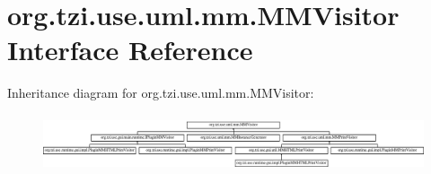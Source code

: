 \hypertarget{interfaceorg_1_1tzi_1_1use_1_1uml_1_1mm_1_1_m_m_visitor}{\section{org.\-tzi.\-use.\-uml.\-mm.\-M\-M\-Visitor Interface Reference}
\label{interfaceorg_1_1tzi_1_1use_1_1uml_1_1mm_1_1_m_m_visitor}
}
Inheritance diagram for org.\-tzi.\-use.\-uml.\-mm.\-M\-M\-Visitor\-:\begin{figure}[H]
\begin{center}
\leavevmode
\includegraphics[height=1.707317cm]{interfaceorg_1_1tzi_1_1use_1_1uml_1_1mm_1_1_m_m_visitor}
\end{center}
\end{figure}
